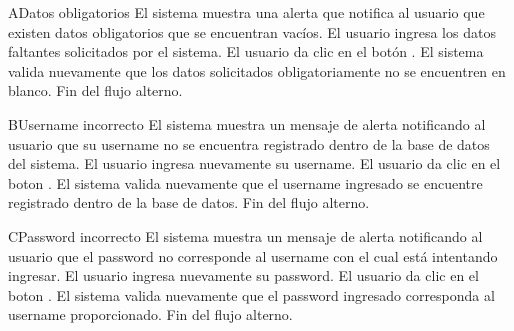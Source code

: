 		\begin{UCtrayectoriaA}{A}{Datos obligatorios}
			\UCpaso El sistema muestra una alerta que notifica al usuario que existen datos obligatorios que se encuentran vac\'ios.
			\UCpaso[\UCactor]  El usuario ingresa los datos faltantes solicitados por el sistema.
			\UCpaso[\UCactor] El usuario da clic en el bot\'on . 			
			\UCpaso El sistema valida nuevamente que los datos solicitados obligatoriamente no se encuentren en blanco.
			\UCpaso[] Fin del flujo alterno.
		\end{UCtrayectoriaA}
		
		\begin{UCtrayectoriaA}{B}{Username incorrecto}
			\UCpaso El sistema muestra un mensaje de alerta notificando al usuario que su username no se encuentra registrado dentro de la base de datos del sistema.
			\UCpaso[\UCactor] El usuario ingresa nuevamente su username.
			\UCpaso[\UCactor] El usuario da clic en el boton .
			\UCpaso El sistema valida nuevamente que el username ingresado se encuentre registrado dentro de la base de datos.
			\UCpaso[] Fin del flujo alterno.
			
		\end{UCtrayectoriaA}
		
		\begin{UCtrayectoriaA}{C}{Password incorrecto}
			\UCpaso El sistema muestra un mensaje de alerta notificando al usuario que el password no corresponde al username con el cual est\'a intentando ingresar.
			\UCpaso[\UCactor] El usuario ingresa nuevamente su password.
			\UCpaso[\UCactor] El usuario da clic en el boton .
			\UCpaso El sistema valida nuevamente que el password ingresado corresponda al username proporcionado.
			\UCpaso[] Fin del flujo alterno.
			
		\end{UCtrayectoriaA}
		

		
		
				
